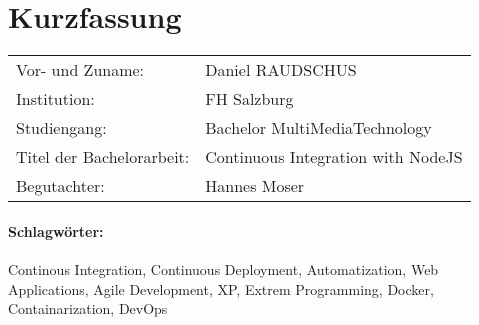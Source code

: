 \section*{Kurzfassung}
\begin{tabular}{l l}
Vor- und Zuname:& Daniel RAUDSCHUS\\
Institution: & FH Salzburg\\
Studiengang: &  Bachelor MultiMediaTechnology\\
Titel der Bachelorarbeit: & Continuous Integration with NodeJS\\
Begutachter: & Hannes Moser\\
\end{tabular}
\vspace{0.5cm}

\paragraph{Schlagwörter:}
Continous Integration, Continuous Deployment, Automatization, Web Applications, Agile Development, XP, Extrem Programming, Docker, Containarization, DevOps
